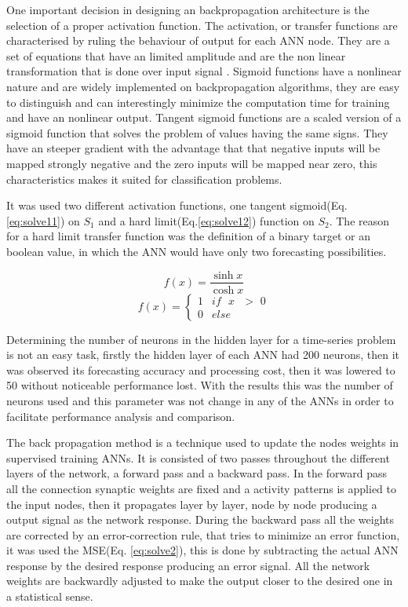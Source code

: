 One important decision in designing an backpropagation architecture is the selection of a proper activation function. The activation, or transfer functions are characterised by ruling the behaviour of output for each ANN node. They are a set of equations that have an limited amplitude and are the non linear transformation that is done over input signal \cite{karlik2011performance}. Sigmoid functions have a nonlinear nature and are widely implemented on backpropagation algorithms, they are easy to distinguish and can interestingly minimize the computation time for training and have an nonlinear output\cite{hecht1992theory, karlik2011performance}. Tangent sigmoid functions are a scaled version of a sigmoid function that solves the problem of values having the same signs. They have an steeper gradient with the advantage that that negative inputs will be mapped strongly negative and the zero inputs will be mapped near zero, this characteristics makes it suited for classification problems.

It was used two different activation functions, one tangent sigmoid(Eq.\ref{eq:solve11}) on $S_1$ and a hard limit(Eq.\ref{eq:solve12}) function on $S_2$. The reason for a hard limit transfer function was the definition of a binary target or an boolean value, in which the ANN would have only two forecasting possibilities.

\begin{equation}
\label{eq:solve11}
f(x) = \frac{\sinh{x}}{\cosh{x}}
\end{equation}
\begin{equation}
\label{eq:solve12}
f(x)=\begin{cases} 
      1 & \text{$if$ $x$ $>$ 0}\\
      0 & \text{$else$}
     \end{cases} 
\end{equation}

Determining the number of neurons in the hidden layer for a time-series problem is not an easy task\cite{zhang1998forecasting}, firstly the hidden layer of each ANN had 200 neurons,
then it was observed its forecasting accuracy and processing cost, then it was lowered to 50 without noticeable performance lost. With the results this was the number of neurons used and this parameter was not change in any of the ANNs in order to facilitate performance analysis and comparison.

The back propagation method is a technique used to update the nodes weights in supervised training ANNs. It is consisted of two passes throughout the different layers of the network, a forward pass and a backward pass. In the forward pass all the connection synaptic weights are fixed and a activity patterns is applied to the input nodes, then it propagates layer by layer, node by node producing a output signal as the network response. During the backward pass all the weights are corrected by an error-correction rule, that tries to minimize an error function, it was used the MSE(Eq. \ref{eq:solve2}), this is done by subtracting the actual ANN response by the desired response producing an error signal. All the network weights are backwardly adjusted to make the output closer to the desired one in a statistical sense\cite{dao2002performance}.

